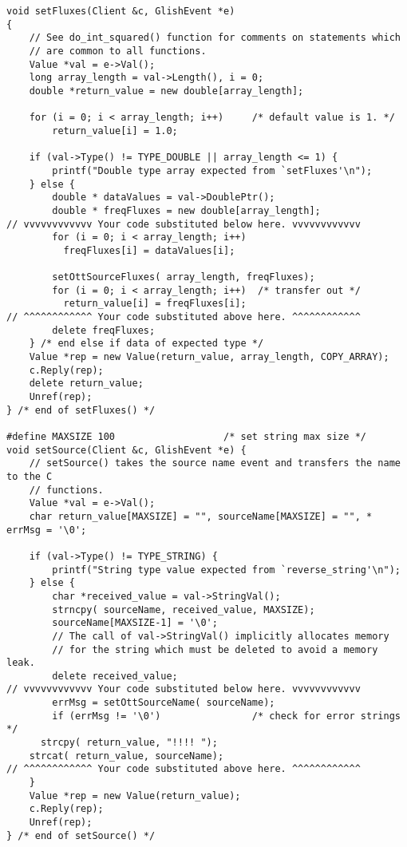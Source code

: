 \begin{verbatim}
void setFluxes(Client &c, GlishEvent *e)
{
    // See do_int_squared() function for comments on statements which
    // are common to all functions.
    Value *val = e->Val();
    long array_length = val->Length(), i = 0;
    double *return_value = new double[array_length];

    for (i = 0; i < array_length; i++)     /* default value is 1. */
        return_value[i] = 1.0;

    if (val->Type() != TYPE_DOUBLE || array_length <= 1) {
        printf("Double type array expected from `setFluxes'\n");
    } else {
        double * dataValues = val->DoublePtr();
        double * freqFluxes = new double[array_length];
// vvvvvvvvvvvv Your code substituted below here. vvvvvvvvvvvv
        for (i = 0; i < array_length; i++) 
          freqFluxes[i] = dataValues[i];
        
        setOttSourceFluxes( array_length, freqFluxes);
        for (i = 0; i < array_length; i++)  /* transfer out */
          return_value[i] = freqFluxes[i];
// ^^^^^^^^^^^^ Your code substituted above here. ^^^^^^^^^^^^
        delete freqFluxes;
    } /* end else if data of expected type */
    Value *rep = new Value(return_value, array_length, COPY_ARRAY);
    c.Reply(rep);
    delete return_value;
    Unref(rep);
} /* end of setFluxes() */

#define MAXSIZE 100                   /* set string max size */
void setSource(Client &c, GlishEvent *e) {
    // setSource() takes the source name event and transfers the name to the C 
    // functions.
    Value *val = e->Val();
    char return_value[MAXSIZE] = "", sourceName[MAXSIZE] = "", * errMsg = '\0';

    if (val->Type() != TYPE_STRING) {
        printf("String type value expected from `reverse_string'\n");
    } else {
        char *received_value = val->StringVal();
        strncpy( sourceName, received_value, MAXSIZE);
        sourceName[MAXSIZE-1] = '\0';
        // The call of val->StringVal() implicitly allocates memory
        // for the string which must be deleted to avoid a memory leak.
        delete received_value;
// vvvvvvvvvvvv Your code substituted below here. vvvvvvvvvvvv
        errMsg = setOttSourceName( sourceName);
        if (errMsg != '\0')                /* check for error strings */
	  strcpy( return_value, "!!!! ");
	strcat( return_value, sourceName);
// ^^^^^^^^^^^^ Your code substituted above here. ^^^^^^^^^^^^
    }
    Value *rep = new Value(return_value);
    c.Reply(rep);
    Unref(rep);
} /* end of setSource() */
\end{verbatim}

